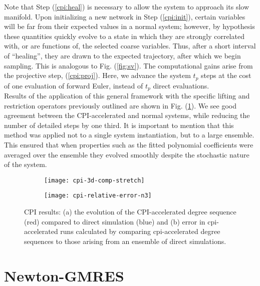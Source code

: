 \documentclass[epjST, final]{svjour}
\begin{document}
\begin{onehalfspace}
Note that Step (\ref{cpi:heal}) is necessary to allow the system to approach its slow manifold. Upon initializing a new network in Step (\ref{cpi:init}), certain variables will be far from their expected values in a normal system; however, by hypothesis these quantities quickly evolve to a state in which they are strongly correlated with, or are functions of, the selected coarse variables. Thus, after a short interval of ``healing'', they are drawn to the expected trajectory, after which we begin sampling. This is analogous to Fig. (\ref{fig:sv}). The computational gains arise from the projective step, (\ref{cpi:proj}). Here, we advance the system $t_p$ steps at the cost of one evaluation of forward Euler, instead of $t_p$ direct evaluations. \\

Results of the application of this general framework with the specific lifting and restriction operators previously outlined are shown in Fig. (\ref{fig:cpi-results}). We see good agreement between the CPI-accelerated and normal systems, while reducing the number of detailed steps by one third. It is important to mention that this method was applied not to a single system instantiation, but to a large ensemble. This ensured that when properties such as the fitted polynomial coefficients were averaged over the ensemble they evolved smoothly despite the stochastic nature of the system.

\begin{figure}[h!]
  \vspace{-5mm}
  \centering
  \begin{subfigure}{0.59\textwidth}
    \centering
    \texttt{[image: cpi-3d-comp-stretch]}
    \subcaption{\label{fig:cpi-error}}
  \end{subfigure} %
  \begin{subfigure}{0.39\textwidth}
    \centering
    \texttt{[image: cpi-relative-error-n3]}
    \subcaption{\label{fig:self-error}}
  \end{subfigure}%
  \caption{CPI results: (a) the evolution of the CPI-accelerated
    degree sequence (red) compared to direct simulation (blue) and (b)
    error in cpi-accelerated runs calculated by comparing
    cpi-accelerated degree sequences to those arising from an ensemble
    of direct simulations. \label{fig:cpi-results}}
\end{figure}


\section{Newton-GMRES}


\end{onehalfspace}
\end{document}
